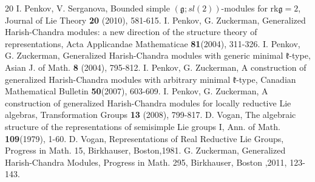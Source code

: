 \documentclass[11pt]{amsart}
\newcommand{\kk}{\mathfrak{k}}
\renewcommand{\gg}{\mathfrak{g}}
\begin{document}
\begin{thebibliography}{20}
 I. Penkov, V. Serganova, Bounded simple $(\gg;sl(2))$-modules for rk$\gg = 2$, Journal of Lie Theory \textbf{20} (2010), 581-615.
 I. Penkov, G. Zuckerman, Generalized Harish-Chandra modules: a new direction of the structure theory of representations, Acta Applicandae Mathematicae \textbf{81}(2004), 311-326.
 I. Penkov, G. Zuckerman, Generalized Harish-Chandra modules with generic minimal $\kk$-type, Asian J. of Math. \textbf{8} (2004), 795-812.
 I. Penkov, G. Zuckerman, A construction of generalized Harish-Chandra modules with arbitrary minimal $\kk$-type, Canadian Mathematical Bulletin \textbf{50}(2007), 603-609.
 I. Penkov, G. Zuckerman, A construction of generalized Harish-Chandra modules for locally reductive Lie algebras, Transformation Groups \textbf{13} (2008), 799-817.
 D. Vogan, The algebraic structure of the representations of semisimple Lie groups I, Ann. of Math. \textbf{109}(1979), 1-60.
 D. Vogan, Representations of Real Reductive Lie Groups, Progress in Math. 15, Birkhauser, Boston,1981.
 G. Zuckerman, Generalized Harish-Chandra Modules, Progress in Math. 295, Birkhauser, Boston ,2011,  123-143.
\end{thebibliography}
\end{document}
